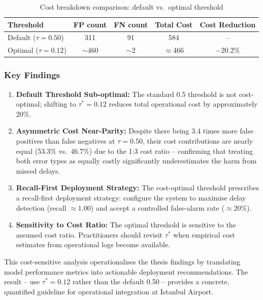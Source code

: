\documentclass{report}
\begin{document}
\begin{table}[htbp]
\centering
\caption{Cost breakdown comparison: default vs.\ optimal threshold}
\label{tab:cost_breakdown}
\begin{tabular}{lcccc}
\toprule
\textbf{Threshold} & \textbf{FP count} & \textbf{FN count} &
  \textbf{Total Cost} & \textbf{Cost Reduction} \\
\midrule
Default ($\tau = 0.50$) & 311 & 91 & 584 & -- \\
Optimal ($\tau = 0.12$) & $\sim$460 & $\sim$2 & $\approx$466 &
  $-$20.2\% \\
\bottomrule
\end{tabular}
\end{table}
 
\subsubsection*{Key Findings}
 
\begin{enumerate}
\item \textbf{Default Threshold Sub-optimal:} The standard 0.5 threshold
  is not cost-optimal; shifting to $\tau^* = 0.12$ reduces total
  operational cost by approximately 20\%.
\item \textbf{Asymmetric Cost Near-Parity:} Despite there being 3.4 times
  more false positives than false negatives at $\tau = 0.50$, their cost
  contributions are nearly equal (53.3\% vs.\ 46.7\%) due to the 1:3
  cost ratio -- confirming that treating both error types as equally
  costly significantly underestimates the harm from missed delays.
\item \textbf{Recall-First Deployment Strategy:} The cost-optimal
  threshold prescribes a recall-first deployment strategy: configure the
  system to maximise delay detection (recall $\approx 1.00$) and accept
  a controlled false-alarm rate ($\approx 20\%$).
\item \textbf{Sensitivity to Cost Ratio:} The optimal threshold is
  sensitive to the assumed cost ratio.  Practitioners should revisit
  $\tau^*$ when empirical cost estimates from operational logs become
  available.
\end{enumerate}
 
This cost-sensitive analysis operationalises the thesis findings by
translating model performance metrics into actionable deployment
recommendations.  The result -- use $\tau^* = 0.12$ rather than the
default 0.50 -- provides a concrete, quantified guideline for operational
integration at Istanbul Airport.
\end{document}
